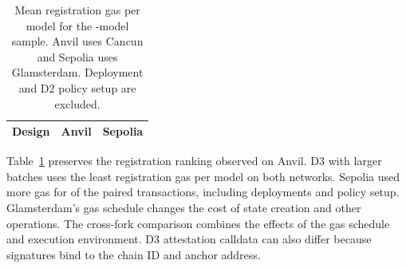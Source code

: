 \begin{table}[t]
\centering
\caption{Mean registration gas per model for the \SepoliaModels-model
sample. Anvil uses Cancun and Sepolia uses Glamsterdam. Deployment
and D2 policy setup are excluded.}
\label{tab:sepolia}
\begin{tabular}{lrr}
\toprule
Design & Anvil & Sepolia \\
\midrule

\end{tabular}
\end{table}

Table~\ref{tab:sepolia} preserves the registration ranking observed on
Anvil. D3 with larger batches uses the least registration gas per
model on both networks. Sepolia used more gas for
\SepoliaHigherGas{} of the \SepoliaPairs{} paired transactions, including
deployments and policy setup. Glamsterdam's gas schedule changes the
cost of state creation and other operations. The cross-fork comparison
combines the effects of the gas schedule and execution environment.
D3 attestation calldata can also differ because signatures bind to
the chain ID and anchor address.
